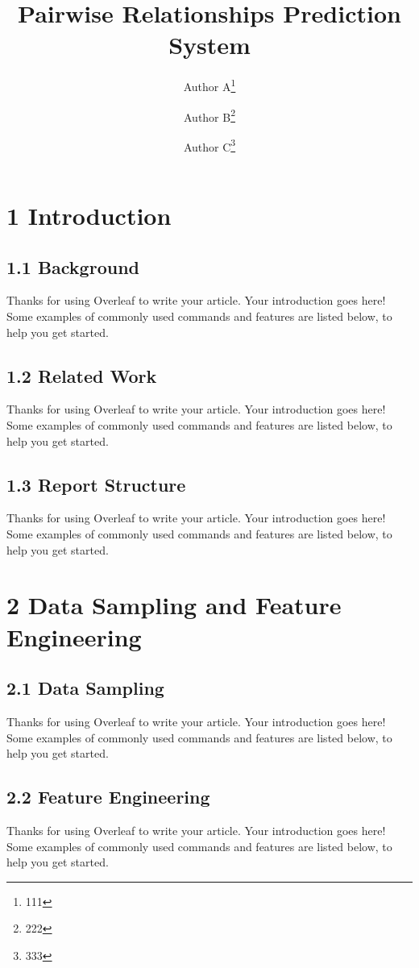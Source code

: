 \documentclass[fleqn,11pt]{olplainarticle}
\title{Pairwise Relationships Prediction System}
\author{Author A\thanks{111}}
\author{Author B\thanks{222}}
\author{Author C\thanks{333}}
\affil{School of Computing and Information Systems, University of Melbourne}
\affil[]{\textit{\{aaa,bbb,ccc\}}@student.unimelb.edu.au}
\begin{document}
\maketitle
\flushbottom
\thispagestyle{empty}
\pagestyle{empty}


\section*{1 Introduction}

\subsection*{1.1 Background}
Thanks for using Overleaf to write your article. Your introduction goes here! Some examples of commonly used commands and features are listed below, to help you get started.

\subsection*{1.2 Related Work}
Thanks for using Overleaf to write your article. Your introduction goes here! Some examples of commonly used commands and features are listed below, to help you get started.

\subsection*{1.3 Report Structure}
Thanks for using Overleaf to write your article. Your introduction goes here! Some examples of commonly used commands and features are listed below, to help you get started.

\section*{2 Data Sampling and Feature Engineering}

\subsection*{2.1 Data Sampling}
Thanks for using Overleaf to write your article. Your introduction goes here! Some examples of commonly used commands and features are listed below, to help you get started.

\subsection*{2.2 Feature Engineering}
Thanks for using Overleaf to write your article. Your introduction goes here! Some examples of commonly used commands and features are listed below, to help you get started.
\end{document}
